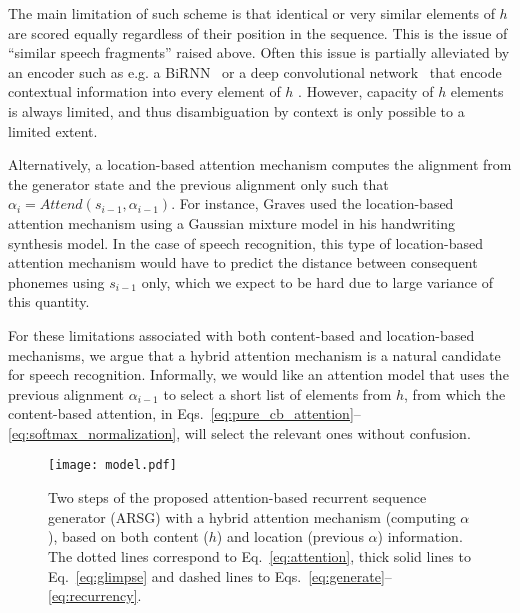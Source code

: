 \documentclass{article}
\begin{document}
The main limitation of such scheme is that identical or very similar elements of
$h$ are scored equally regardless of their position in the
sequence. This is the issue of ``similar speech fragments'' raised above.
Often this issue is partially alleviated by an encoder such
as e.g. a BiRNN~\cite{bahdanau_neural_2014} or a deep convolutional
network~\cite{xu_show_2015} that encode contextual
information into every element of $h$ . However, capacity of
$h$ elements is always limited, and thus disambiguation by
context is only possible to a limited extent.



Alternatively, a location-based attention mechanism computes the alignment from
the generator state and the previous alignment only such that
$\alpha_{i} = Attend(s_{i-1}, \alpha_{i-1})$. 
For instance, Graves \cite{graves_generating_2013} used the location-based
attention mechanism using a Gaussian mixture model in his handwriting synthesis
model.  In the case of speech recognition, this type of location-based attention
mechanism would have to predict the distance between consequent 
phonemes using $s_{i-1}$ only, which we expect to be hard due to
large variance of this quantity.

For these limitations associated with both content-based and location-based
mechanisms, we argue that a hybrid attention mechanism is a natural candidate
for speech recognition. Informally, we would like an attention model that uses
the previous alignment $\alpha_{i-1}$ to select a short list of elements from
$h$, from which the content-based attention, in
Eqs.~\eqref{eq:pure_cb_attention}--\eqref{eq:softmax_normalization}, will select
the relevant ones without confusion.

\begin{figure}
    \centering
\hfill
    \begin{minipage}{0.6\textwidth}
        \centering
        \texttt{[image: model.pdf]}
    \end{minipage}
    \begin{minipage}{0.38\textwidth}
        \caption{
            Two steps of the proposed attention-based recurrent sequence
            generator (ARSG) with a hybrid attention mechanism (computing $\alpha$), based on
            both content ($h$) and location (previous $\alpha$) information.
            The dotted lines correspond to Eq.~\eqref{eq:attention}, thick solid
            lines to Eq.~\eqref{eq:glimpse} and dashed lines to
            Eqs.~\eqref{eq:generate}--\eqref{eq:recurrency}.
        }
        \label{fig:model}
    \end{minipage}
    \hfill


  \vspace{-4mm}
\end{figure}    
\end{document}
